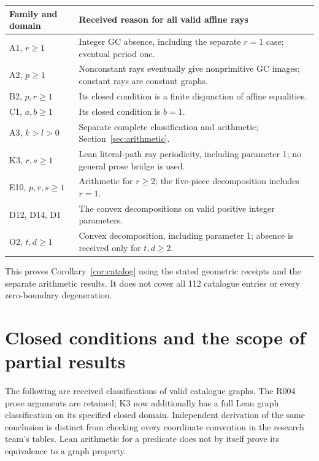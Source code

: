 \documentclass[11pt]{amsart}
\theoremstyle{definition}\newtheorem{definition}{Definition}
\begin{document}
\begin{center}\small
\begin{tabular}{p{}p{}}\toprule
Family and domain & Received reason for all valid affine rays\\\midrule
A1, $r\ge1$ & Integer GC absence, including the separate $r=1$ case; eventual period one.\\
A2, $p\ge1$ & Nonconstant rays eventually give nonprimitive GC images; constant rays are constant graphs.\\
B2, $p,r\ge1$ & Its closed condition is a finite disjunction of affine equalities.\\
C1, $a,b\ge1$ & Its closed condition is $b=1$.\\
A3, $k>l>0$ & Separate complete classification and arithmetic; Section~\ref{sec:arithmetic}.\\
K3, $r,s\ge1$ & Lean literal-path ray periodicity, including parameter 1; no general prose bridge is used.\\
E10, $p,r,s\ge1$ & Arithmetic for $r\ge2$; the five-piece decomposition includes $r=1$.\\
D12, D14, D1 & The convex decompositions on valid positive integer parameters.\\
O2, $t,d\ge1$ & Convex decomposition, including parameter 1; absence is received only for $t,d\ge2$.\\\bottomrule
\end{tabular}
\end{center}
This proves Corollary~\ref{cor:catalog} using the stated geometric
receipts and the separate arithmetic results. It does not cover all
112 catalogue entries or every zero-boundary degeneration.

\section{Closed conditions and the scope of partial results}\label{sec:conditions}
The following are received classifications of valid catalogue graphs.
The R004 prose arguments are retained; K3 now additionally has a full
Lean graph classification on its specified closed domain. Independent derivation of the same conclusion is distinct
from checking every coordinate convention in the research team's
tables. Lean arithmetic for a predicate does not by itself prove its
equivalence to a graph property.
\end{document}
